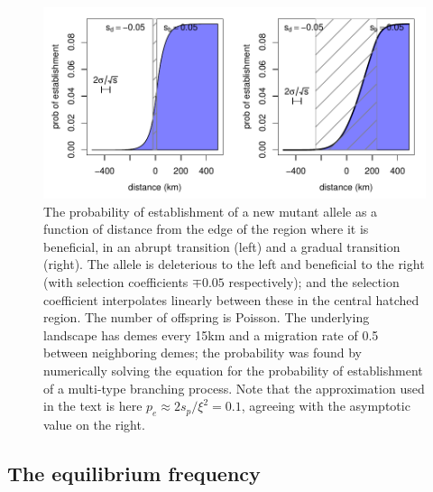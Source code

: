 \documentclass{article}
\begin{document}
\begin{figure}[ht!]
    \begin{center}
        \includegraphics{prob-establishment}
    \end{center}
    \caption{The probability of establishment of a new mutant allele as a function of distance from the edge of the region where it is beneficial,
    in an abrupt transition (left) and a gradual transition (right).
    The allele is deleterious to the left and beneficial to the right (with selection coefficients $\mp 0.05$ respectively);
    and the selection coefficient interpolates linearly between these in the central hatched region.
    The number of offspring is Poisson.
    The underlying landscape has demes every 15km and a migration rate of 0.5 between neighboring demes;
    the probability was found by numerically solving the equation for the probability of establishment of a multi-type branching process.
    Note that the approximation used in the text is here $p_e \approx 2 s_p / \xi^2 = 0.1$,
    agreeing with the asymptotic value on the right.
    \label{fig:prob_estab_calcs}
    }
\end{figure}



\subsection[Equilibrium Frequency]{The equilibrium frequency}
\label{apx:eqfreq}
\end{document}
